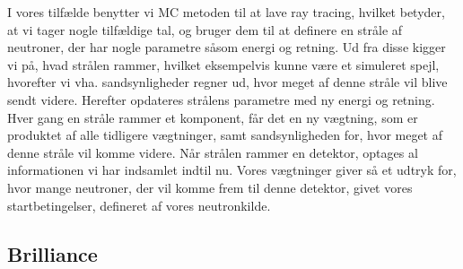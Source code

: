 \documentclass[12pt,oneside,a4paper]{article}
\begin{document}
{{{{{I vores tilfælde benytter vi MC metoden til at lave ray tracing, hvilket betyder, at vi tager nogle tilfældige tal, og bruger dem til at definere en stråle af neutroner, der har nogle parametre såsom energi og retning.
Ud fra disse  kigger vi på, hvad strålen rammer, hvilket eksempelvis kunne være et simuleret spejl, hvorefter vi vha. sandsynligheder regner ud, hvor meget af denne stråle vil blive sendt videre. Herefter opdateres strålens parametre med ny energi og retning.
Hver gang en stråle rammer et komponent, får det en ny vægtning, som er produktet af alle tidligere vægtninger, samt sandsynligheden for, hvor meget af denne stråle vil komme videre.
Når strålen rammer en detektor, optages al informationen vi har indsamlet indtil nu. Vores vægtninger giver så et udtryk for, hvor mange neutroner, der vil komme frem til denne detektor, givet vores startbetingelser, defineret af vores neutronkilde. \cite{wiki:monte_carlo}

\subsection{Brilliance}

}}}}}
\end{document}
